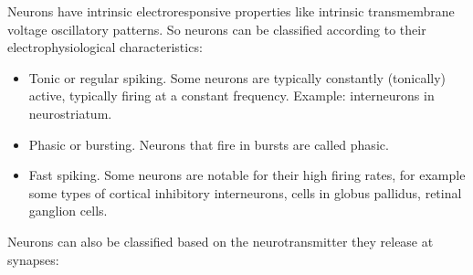 Neurons have intrinsic electroresponsive properties like intrinsic transmembrane voltage oscillatory patterns. So neurons can be classified according to their electrophysiological characteristics:

\begin{itemize}
\tightlist
\item
  Tonic or regular spiking. Some neurons are typically constantly (tonically) active, typically firing at a constant frequency. Example: interneurons in neurostriatum.
\item
  Phasic or bursting. Neurons that fire in bursts are called phasic.
\item
  Fast spiking. Some neurons are notable for their high firing rates, for example some types of cortical inhibitory interneurons, cells in globus pallidus, retinal ganglion cells.
\end{itemize}

Neurons can also be classified based on the neurotransmitter they release at synapses:

